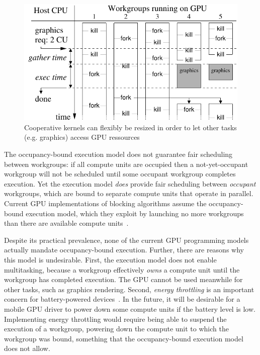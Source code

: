 \documentclass[parskip=half,sigconf,review, anonymous=true, acmcopyrightmode=none]{acmart}
\begin{document}
\begin{figure}[t]
\centering
\includegraphics[width=\columnwidth]{overview.pdf}
\caption{Cooperative kernels can flexibly be resized in order to let
other tasks (e.g. graphics) access GPU ressources}
\label{fig:overview}
\end{figure}

The occupancy-bound execution model does not guarantee fair scheduling
between workgroups: if all compute units are occupied then a
not-yet-occupant workgroup will not be scheduled until some occupant
workgroup completes execution.  Yet the execution model \emph{does}
provide fair scheduling between \emph{occupant} workgroups, which are
bound to separate compute units that operate in parallel.  Current GPU
implementations of blocking algorithms assume the occupancy-bound
execution model, which they exploit by launching no more workgroups
than there are available compute units~\cite{owens-persistent}.

Despite its practical prevalence, none of the current GPU programming
models actually mandate occupancy-bound execution.  Further, there are
reasons why this model is undesirable.
First, the execution model does not enable
multitasking, because a workgroup effectively \emph{owns} a compute
unit until the workgroup has completed execution.  The GPU cannot be used meanwhile for other
tasks, such as graphics rendering.
Second, \emph{energy throttling} is
an important concern for battery-powered devices~\cite{DBLP:journals/comsur/Vallina-RodriguezC13}.  In the future, it will be desirable for a mobile GPU driver to
power down some compute units if the battery level is low.
Implementing energy
throttling would require being able to suspend the execution of a
workgroup, powering down the compute unit to which the workgroup was
bound, something that the occupancy-bound execution model does not allow.
\end{document}
